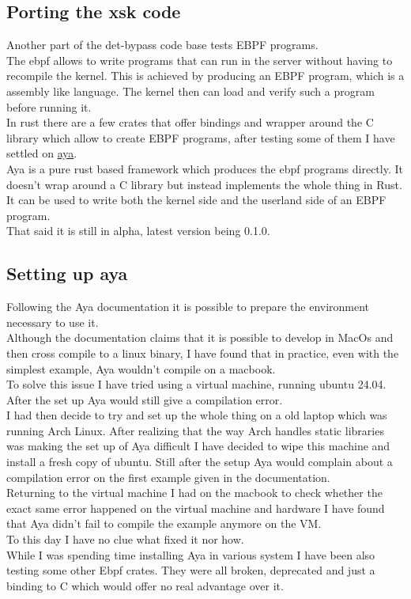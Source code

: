 \documentclass{article}
\begin{document}
\subsection*{Porting the xsk code}
Another part of the det-bypass code base tests EBPF programs.\\
The ebpf allows to write programs that can run in the server without having to recompile the kernel. This is achieved by producing an EBPF program, which is a assembly like language. The kernel then can load and verify such a program before running it.\\
In rust there are a few crates that offer bindings and wrapper around the C library which allow to create EBPF programs, after testing some of them I have settled on \href{https://aya-rs.dev/book/}{aya}.\\
Aya is a pure rust based framework which produces the ebpf programs directly. It doesn't wrap around a C library but instead implements the whole thing in Rust. It can be used to write both the kernel side and the userland side of an EBPF program.\\
That said it is still in alpha, latest version being 0.1.0.

\subsection*{Setting up aya}
Following the Aya documentation it is possible to prepare the environment necessary to use it.\\
Although the documentation claims that it is possible to develop in MacOs and then cross compile to a linux binary, I have found that in practice, even with the simplest example, Aya wouldn't compile on a macbook.\\
To solve this issue I have tried using a virtual machine, running ubuntu 24.04. After the set up Aya would still give a compilation error.\\
I had then decide to try and set up the whole thing on a old laptop which was running Arch Linux. After realizing that the way Arch handles static libraries was making the set up of Aya difficult I have decided to wipe this machine and install a fresh copy of ubuntu. Still after the setup Aya would complain about a compilation error on the first example given in the documentation.\\
Returning to the virtual machine I had on the macbook to check whether the exact same error happened on the virtual machine and hardware I have found that Aya didn't fail to compile the example anymore on the VM.\\
To this day I have no clue what fixed it nor how.\\
While I was spending time installing Aya in various system I have been also testing some other Ebpf crates. They were all broken, deprecated and just a binding to C which would offer no real advantage over it.
\end{document}
